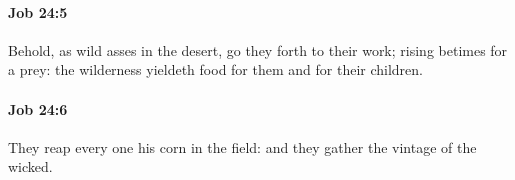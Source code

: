 		\paragraph{Job 24:5} %
			\label{JOB-24-5}

			Behold, as wild asses in the desert, go they forth to their work; rising betimes for a prey: the wilderness yieldeth food for them and for their children.


		\paragraph{Job 24:6} %
			\label{JOB-24-6}

			They reap every one his corn in the field: and they gather the vintage of the wicked.


